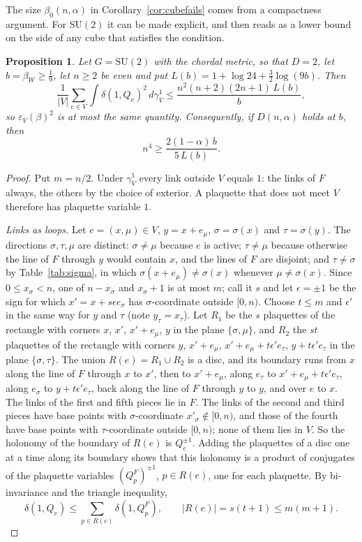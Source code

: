 \documentclass[11pt]{amsart}
\newtheorem{proposition}[theorem]{Proposition}
\theoremstyle{definition}
\theoremstyle{remark}
\numberwithin{equation}{section}
\newcommand{\SU}{\mathrm{SU}}
\begin{document}
The size $\beta_0(n,\alpha)$ in Corollary~\ref{cor:cubefails} comes from a
compactness argument. For $\SU(2)$ it can be made explicit, and then reads as
a lower bound on the side of any cube that satisfies the condition.

\begin{proposition}\label{prop:cubesize}
Let $G=\SU(2)$ with the chordal metric, so that $D=2$, let $b=\beta_W\ge\frac19$,
let $n\ge2$ be even and put $L(b)=1+\log24+\frac32\log(9b)$. Then
\[
\frac1{|V|}\sum_{e\in V}\int\delta(1,Q_e)^2\,d\gamma^1_V\le
\frac{n^2(n+2)(2n+1)\,L(b)}b ,
\]
so $\varepsilon_V(\beta)^2$ is at most the same quantity. Consequently, if
$D(n,\alpha)$ holds at $b$, then
\[
n^4\ge\frac{2(1-\alpha)\,b}{5\,L(b)} .
\]
\end{proposition}

\begin{proof}
Put $m=n/2$. Under $\gamma^1_V$ every link outside $V$ equals $1$: the links
of $F$ always, the others by the choice of exterior. A plaquette that does
not meet $V$ therefore has plaquette variable $1$.

\emph{Links as loops.} Let $e=(x,\mu)\in V$, $y=x+e_\mu$, $\sigma=\sigma(x)$
and $\tau=\sigma(y)$. The directions $\sigma,\tau,\mu$ are distinct:
$\sigma\ne\mu$ because $e$ is active; $\tau\ne\mu$ because otherwise the line of
$F$ through $y$ would contain $x$, and the lines of $F$ are disjoint; and
$\tau\ne\sigma$ by Table~\ref{tab:sigma}, in which $\sigma(x+e_\mu)\ne\sigma(x)$
whenever $\mu\ne\sigma(x)$. Since $0\le x_\sigma<n$, one of $n-x_\sigma$ and
$x_\sigma+1$ is at most $m$; call it $s$ and let $\epsilon=\pm1$ be the sign
for which $x'=x+s\epsilon e_\sigma$ has $\sigma$-coordinate outside $[0,n)$.
Choose $t\le m$ and $\epsilon'$ in the same way for $y$ and $\tau$ (note
$y_\tau=x_\tau$). Let $R_1$ be the $s$ plaquettes of the rectangle with corners
$x$, $x'$, $x'+e_\mu$, $y$ in the plane $\{\sigma,\mu\}$, and $R_2$ the $st$
plaquettes of the rectangle with corners $y$, $x'+e_\mu$,
$x'+e_\mu+t\epsilon'e_\tau$, $y+t\epsilon'e_\tau$ in the plane $\{\sigma,\tau\}$.
The union $R(e)=R_1\cup R_2$ is a disc, and its boundary runs from $x$ along
the line of $F$ through $x$ to $x'$, then to $x'+e_\mu$, along $e_\tau$ to
$x'+e_\mu+t\epsilon'e_\tau$, along $e_\sigma$ to $y+t\epsilon'e_\tau$, back
along the line of $F$ through $y$ to $y$, and over $e$ to $x$. The links of the
first and fifth pieces lie in $F$. The links of the second and third pieces
have base points with $\sigma$-coordinate $x'_\sigma\notin[0,n)$, and those of
the fourth have base points with $\tau$-coordinate outside $[0,n)$; none of
them lies in $V$. So the holonomy of the boundary of $R(e)$ is $Q_e^{\pm1}$.
Adding the plaquettes of a disc one at a time along its boundary shows that
this holonomy is a product of conjugates of the plaquette variables
$(Q^F_p)^{\pm1}$, $p\in R(e)$, one for each plaquette. By bi-invariance and the
triangle inequality,
\[
\delta(1,Q_e)\le\sum_{p\in R(e)}\delta(1,Q^F_p),\qquad |R(e)|=s(t+1)\le
m(m+1).
\]


\end{proof}
\end{document}
